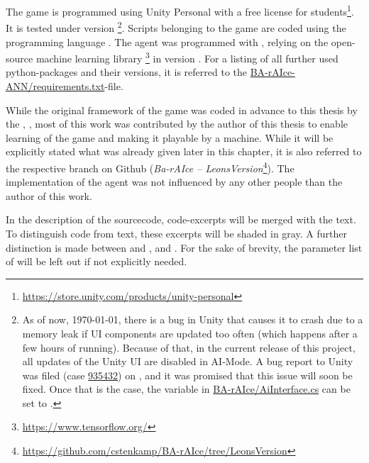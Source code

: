 The game is programmed using Unity Personal with a free license for students\footnote{\url{https://store.unity.com/products/unity-personal}}. It is tested under version \footnote{As of now, \today, there is a bug in Unity that causes it to crash due to a memory leak if UI components are updated too often (which happens after a few hours of running). Because of that, in the current release of this project, all updates of the Unity UI are disabled in AI-Mode. A bug report to Unity was filed (case \href{https://fogbugz.unity3d.com/default.asp?935432_h1bir10rkmbc658k}{935432}) on , and it was promised that this issue will soon be fixed. Once that is the case, the variable  in \href{https://github.com/cstenkamp/BA-rAIce/blob/ef2dc018f36cd9ad65df90e65d8ab840c822567e/Assets/Scripts/AiInterface.cs\#L12-L13}{BA-rAIce/AiInterface.cs} can be set to .}.
Scripts belonging to the game are coded using the programming language . The agent was programmed with , relying on the open-source machine learning library \cite{abadi_tensorflow:_2015}\footnote{\url{https://www.tensorflow.org/}} in version . For a listing of all further used python-packages and their versions, it is referred to the \href{https://github.com/cstenkamp/BA-rAIce-ANN/blob/master/requirements.txt}{BA-rAIce-ANN/requirements.txt}-file. 

While the original framework of the game was coded in advance to this thesis by the \leonbase, , most of this work was contributed by the author of this thesis to enable learning of the game and making it playable by a machine. While it will be explicitly stated what was already given later in this chapter, it is also referred to the respective branch on Github (\textit{Ba-rAIce -- LeonsVersion}\footnote{\url{https://github.com/cstenkamp/BA-rAIce/tree/LeonsVersion}}). The implementation of the agent was not influenced by any other people than the author of this work.

In the description of the sourcecode, code-excerpts will be merged with the text. To distinguish code from text, these excerpts will be shaded in gray. A further distinction is made between  and ,  and . For the sake of brevity, the parameter list of  will be left out if not explicitly needed.\\

